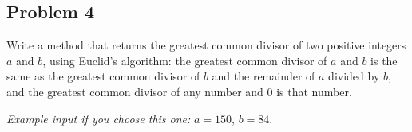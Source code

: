 \documentclass[11pt]{article}
\begin{document}
\subsection{Problem 4}
Write a method that returns the greatest common divisor of two positive
integers $a$ and $b$, using Euclid's algorithm: the greatest common divisor
of $a$ and $b$ is the same as the greatest common divisor of $b$ and the
remainder of $a$ divided by $b$, and the greatest common divisor of any
number and 0 is that number.

\vspace{4pt}\noindent\textit{Example input if you choose this one:} $a = 150$, $b = 84$.
\end{document}
